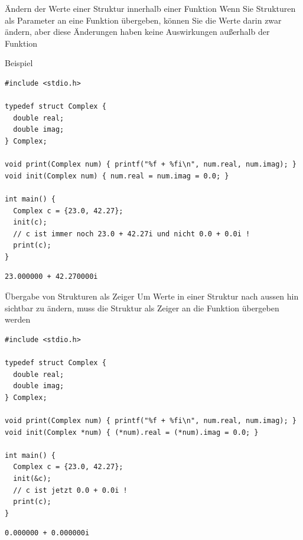\documentclass[presentation]{beamer}
\begin{document}
\begin{frame}[label={sec:org989b13d},fragile]{Ändern der Werte einer Struktur innerhalb einer Funktion}
 Wenn Sie Strukturen als Parameter an eine Funktion übergeben, können
Sie die Werte darin zwar ändern, aber \alert{diese Änderungen haben keine
Auswirkungen außerhalb der Funktion}
\begin{exampleblock}{Beispiel}
\begin{verbatim}
#include <stdio.h>

typedef struct Complex {
  double real;
  double imag;
} Complex;

void print(Complex num) { printf("%f + %fi\n", num.real, num.imag); }
void init(Complex num) { num.real = num.imag = 0.0; }

int main() {
  Complex c = {23.0, 42.27};
  init(c);
  // c ist immer noch 23.0 + 42.27i und nicht 0.0 + 0.0i !
  print(c);
}
\end{verbatim}

\begin{verbatim}
23.000000 + 42.270000i
\end{verbatim}
\end{exampleblock}
\end{frame}

\begin{frame}[label={sec:orgc7c7733},fragile]{Übergabe von Strukturen als Zeiger}
 Um Werte in einer Struktur nach aussen hin sichtbar zu ändern, muss
die Struktur als Zeiger an die Funktion übergeben werden
\begin{verbatim}
#include <stdio.h>

typedef struct Complex {
  double real;
  double imag;
} Complex;

void print(Complex num) { printf("%f + %fi\n", num.real, num.imag); }
void init(Complex *num) { (*num).real = (*num).imag = 0.0; }

int main() {
  Complex c = {23.0, 42.27};
  init(&c);
  // c ist jetzt 0.0 + 0.0i !
  print(c);
}
\end{verbatim}

\begin{verbatim}
0.000000 + 0.000000i
\end{verbatim}
\end{frame}
\end{document}
